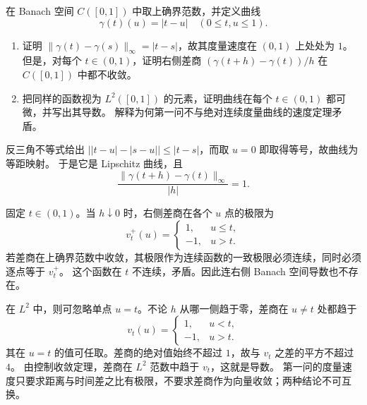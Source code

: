 \begin{optionalexercise}\label{b1:ex:16-banach-and-metric-derivatives}
在 Banach 空间 \(C([0,1])\) 中取上确界范数，并定义曲线
\[
 \gamma(t)(u)=|t-u|
 \quad(0\le t,u\le1).
\]
\begin{enumerate}
\item\label{b1:item:16-c-curve-no-derivative}
证明 \(\|\gamma(t)-\gamma(s)\|_\infty=|t-s|\)，故其度量速度在 \((0,1)\) 上处处为 \(1\)。
但是，对每个 \(t\in(0,1)\)，证明右侧差商 \((\gamma(t+h)-\gamma(t))/h\) 在 \(C([0,1])\) 中都不收敛。
\item\label{b1:item:16-l2-curve-derivative}
把同样的函数视为 \(L^2([0,1])\) 的元素，证明曲线在每个 \(t\in(0,1)\) 都可微，并写出其导数。
解释为何第一问不与绝对连续度量曲线的速度定理矛盾。
\end{enumerate}
\end{optionalexercise}
\begin{solution}
反三角不等式给出 \(\bigl||t-u|-|s-u|\bigr|\le|t-s|\)，而取 \(u=0\) 即取得等号，故曲线为等距映射。
于是它是 Lipschitz 曲线，且
\[
 \frac{\|\gamma(t+h)-\gamma(t)\|_\infty}{|h|}=1.
\]

固定 \(t\in(0,1)\)。当 \(h\downarrow0\) 时，右侧差商在各个 \(u\) 点的极限为
\[
 v_t^+(u)=
 \begin{cases}
 1,&u\le t,\\
 -1,&u>t.
 \end{cases}
\]
若差商在上确界范数中收敛，其极限作为连续函数的一致极限必须连续，同时必须逐点等于 \(v_t^+\)。
这个函数在 \(t\) 不连续，矛盾。因此连右侧 Banach 空间导数也不存在。

在 \(L^2\) 中，则可忽略单点 \(u=t\)。不论 \(h\) 从哪一侧趋于零，差商在 \(u\ne t\) 处都趋于
\[
 v_t(u)=
 \begin{cases}
 1,&u<t,\\
 -1,&u>t.
 \end{cases}
\]
其在 \(u=t\) 的值可任取。差商的绝对值始终不超过 \(1\)，故与 \(v_t\) 之差的平方不超过 \(4\)。
由控制收敛定理，差商在 \(L^2\) 范数中趋于 \(v_t\)，这就是导数。
第一问的度量速度只要求距离与时间差之比有极限，不要求差商作为向量收敛；两种结论不可互换。
\end{solution}

